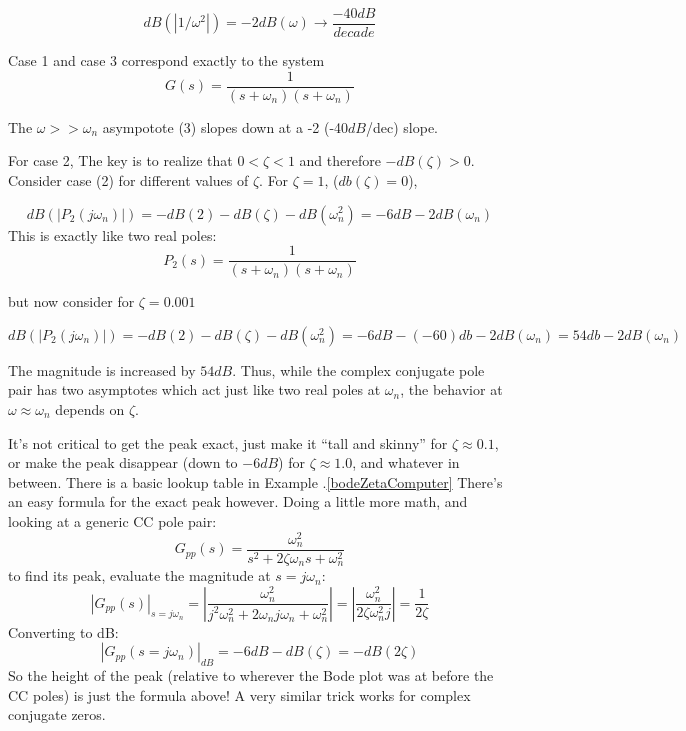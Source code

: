 \[
dB(|1/\omega^2|) = -2dB(\omega) \to \frac {-40dB}  {decade}
\]

Case 1 and case 3 correspond exactly to the system
\[
G(s) = \frac {1}{(s+\omega_n)(s+\omega_n)}
\]


The $\omega >> \omega_n$ asympotote (3) slopes down at a -2 (-40$dB$/dec) slope.


For case 2, The key is to realize that $0<\zeta<1$ and therefore $-dB(\zeta) > 0$.
Consider case (2) for different values of $\zeta$.  For $\zeta = 1$, ($db(\zeta)=0$),

\[
dB(|P_2(j\omega_n)|) =  -dB(2) -dB(\zeta) -dB(\omega_n^2) = -6dB -2 dB(\omega_n)
\]
This is exactly like two real poles:
\[
P_2(s) = \frac {1}{(s+\omega_n)(s+\omega_n)}
\]

but now consider for $\zeta= 0.001$

\[
dB(|P_2(j\omega_n)|) =  -dB(2) -dB(\zeta) -dB(\omega_n^2) = -6dB -(-60)db -2 dB(\omega_n) = 54db-2dB(\omega_n)
\]

The magnitude is increased by $54dB$.   Thus, while the complex conjugate pole pair has two asymptotes which act just like two real poles at $\omega_n$, the behavior at $\omega \approx \omega_n$ depends on $\zeta$.

%


It's not critical to get the peak exact, just make it ``tall and skinny'' for
$\zeta \approx 0.1$, or make the peak disappear (down to $-6dB$)
for $\zeta \approx 1.0$, and whatever
in between.   There is a basic lookup table in Example  \thechapter.\ref{bodeZetaComputer}
There's an easy formula for the exact peak however.
Doing a little more math, and looking at a generic CC pole pair:
\[
G_{pp}(s) = \frac {\omega_n^2 }  {s^2 + 2\zeta\omega_n s + \omega_n^2}
\]
to find its peak, evaluate the magnitude at $s=j\omega_n$:
\[
| G_{pp}(s) |_{s=j\omega_n} = \left |\frac {\omega_n^2}  {j^2\omega_n^2 + 2\omega_n j\omega_n  + \omega_n^2}  \right |  = \left |\frac {\omega_n^2} {2\zeta \omega_n^2 j } \right | = \frac {1}  {2\zeta}
\]
Converting to dB:
\[
| G_{pp}(s=j\omega_n) |_{dB} = -6dB - dB(\zeta) = -dB(2\zeta)
\]
So the height of the peak (relative to wherever the Bode plot was at before the CC
poles) is just the formula above!  A very similar trick works for complex conjugate
zeros.

